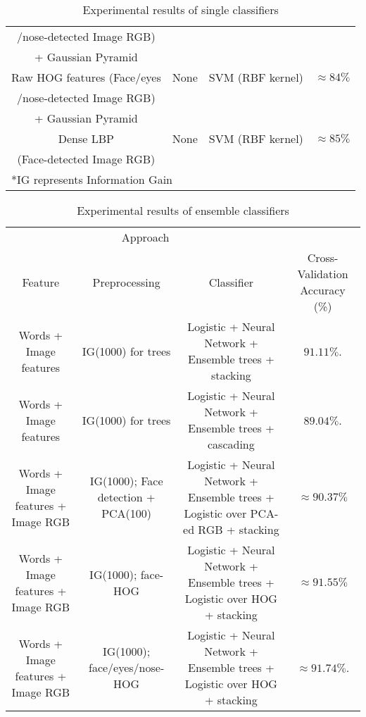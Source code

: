 \begin{table}[h!]
\begin{tabular*}{\textwidth}{c @{\extracolsep{\fill}}ccc}
/nose-detected Image RGB) &  &  &  \\ 
+ Gaussian Pyramid &  &  &  \\ \hline
Raw HOG features (Face/eyes & None &  SVM (RBF kernel) & $\approx 84\%$ \\
/nose-detected Image RGB) & & & \\ 
+ Gaussian Pyramid &  &  &  \\ \hline
Dense LBP  & None & SVM (RBF kernel) & $\approx 85\%$ \\
(Face-detected Image RGB) & & & \\
\hline
\multicolumn{4}{l}{*IG represents Information Gain} \\
\hline
\end{tabular*}
\caption{Experimental results of single classifiers}
\label{Table 1}
\end{table}

\begin{table}[h!]
\centering
\begin{tabular}{ c c c c}
\hline
\multicolumn{3}{c}{Approach} \\
\cline{1-3}
Feature & Preprocessing & Classifier & Cross-Validation Accuracy (\%) \\
\hline
Words + Image features & IG(1000) for trees & Logistic + Neural Network + Ensemble trees + stacking & $91.11\%$. \\
Words + Image features & IG(1000) for trees & Logistic + Neural Network + Ensemble trees + cascading & $89.04\%$. \\
Words + Image features + Image RGB & IG(1000); Face detection + PCA(100) & Logistic + Neural Network + Ensemble trees + Logistic over PCA-ed RGB + stacking & $\approx 90.37\%$ \\
Words + Image features + Image RGB & IG(1000); face-HOG & Logistic + Neural Network + Ensemble trees + Logistic over HOG + stacking & $\approx 91.55\%$ \\
Words + Image features + Image RGB & IG(1000); face/eyes/nose-HOG & Logistic + Neural Network + Ensemble trees + Logistic over HOG + stacking & $\approx 91.74\%$. 
\end{tabular}
\caption{Experimental results of ensemble classifiers}
\label{Table 2}
\end{table}


